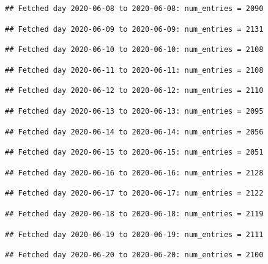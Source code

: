 \documentclass[]{article}
\begin{document}
\begin{verbatim}
## Fetched day 2020-06-08 to 2020-06-08: num_entries = 2090
\end{verbatim}

\begin{verbatim}
## Fetched day 2020-06-09 to 2020-06-09: num_entries = 2131
\end{verbatim}

\begin{verbatim}
## Fetched day 2020-06-10 to 2020-06-10: num_entries = 2108
\end{verbatim}

\begin{verbatim}
## Fetched day 2020-06-11 to 2020-06-11: num_entries = 2108
\end{verbatim}

\begin{verbatim}
## Fetched day 2020-06-12 to 2020-06-12: num_entries = 2110
\end{verbatim}

\begin{verbatim}
## Fetched day 2020-06-13 to 2020-06-13: num_entries = 2095
\end{verbatim}

\begin{verbatim}
## Fetched day 2020-06-14 to 2020-06-14: num_entries = 2056
\end{verbatim}

\begin{verbatim}
## Fetched day 2020-06-15 to 2020-06-15: num_entries = 2051
\end{verbatim}

\begin{verbatim}
## Fetched day 2020-06-16 to 2020-06-16: num_entries = 2128
\end{verbatim}

\begin{verbatim}
## Fetched day 2020-06-17 to 2020-06-17: num_entries = 2122
\end{verbatim}

\begin{verbatim}
## Fetched day 2020-06-18 to 2020-06-18: num_entries = 2119
\end{verbatim}

\begin{verbatim}
## Fetched day 2020-06-19 to 2020-06-19: num_entries = 2111
\end{verbatim}

\begin{verbatim}
## Fetched day 2020-06-20 to 2020-06-20: num_entries = 2100
\end{verbatim}
\end{document}
